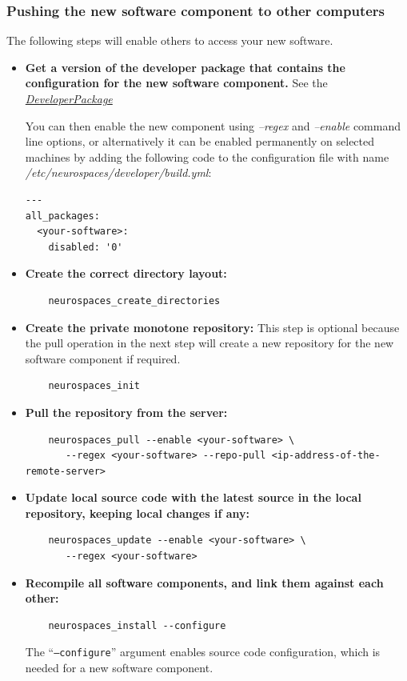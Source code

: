 \documentclass[12pt]{article}
\begin{document}
\subsubsection*{Pushing the new software component to other computers}

The following steps will enable others to access your new software.

\begin{itemize}

\item {\bf Get a version of the developer package that contains the
    configuration for the new software component.}  See
  the~\href{../developer-package/developer-package.tex}{\it
    DeveloperPackage}

  You can then enable the new component using {\it --regex} and {\it
    --enable} command line options, or alternatively it can be enabled
  permanently on selected machines by adding the following code to the
  configuration file with name {\it
    /etc/neurospaces/developer/build.yml}:

\begin{verbatim}
---
all_packages:
  <your-software>:
    disabled: '0'
\end{verbatim}


\item {\bf Create the correct directory layout:}
\begin{verbatim}
	neurospaces_create_directories
\end{verbatim}

\item {\bf Create the private monotone repository:} This step is
  optional because the pull operation in the next step will create a
  new repository for the new software component if required.
\begin{verbatim}
	neurospaces_init
\end{verbatim}

\item {\bf Pull the repository from the server:}
\begin{verbatim}
	neurospaces_pull --enable <your-software> \
	   --regex <your-software> --repo-pull <ip-address-of-the-remote-server>
\end{verbatim}
  
\item {\bf Update local source code with the latest source in the
    local repository, keeping local changes if any:}
\begin{verbatim}
	neurospaces_update --enable <your-software> \
	   --regex <your-software>
\end{verbatim}
  
\item {\bf Recompile all software components, and link them against
    each other:}
\begin{verbatim}
	neurospaces_install --configure
\end{verbatim}
  The ``{\tt --configure}'' argument enables source code
  configuration, which is needed for a new software component.
\end{itemize}
\end{document}

